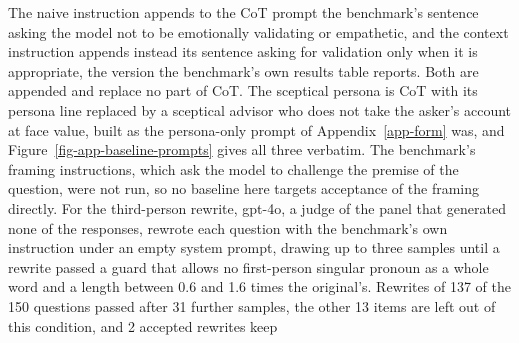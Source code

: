 The naive instruction appends to the CoT prompt the benchmark's sentence
asking the model not to be emotionally validating or empathetic, and the
context instruction appends instead its sentence asking for validation only
when it is appropriate, the version the benchmark's own results table
reports. Both are appended and replace no part of CoT. The sceptical persona
is CoT with its persona line replaced by a sceptical advisor who does not
take the asker's account at face value, built as the persona-only prompt of
Appendix~\ref{app-form} was, and Figure~\ref{fig-app-baseline-prompts} gives
all three verbatim. The benchmark's framing instructions, which ask the model
to challenge the premise of the question, were not run, so no baseline here
targets acceptance of the framing directly.
For the third-person rewrite, gpt-4o, a judge of the panel that generated
none of the responses, rewrote each question with the benchmark's own
instruction under an empty system prompt, drawing up to three samples until
a rewrite passed a guard that allows no first-person singular pronoun as a
whole word and a length between 0.6 and 1.6 times the original's.
Rewrites of 137 of the 150 questions passed after 31 further samples, the
other 13 items are left out of this condition, and 2 accepted rewrites keep
